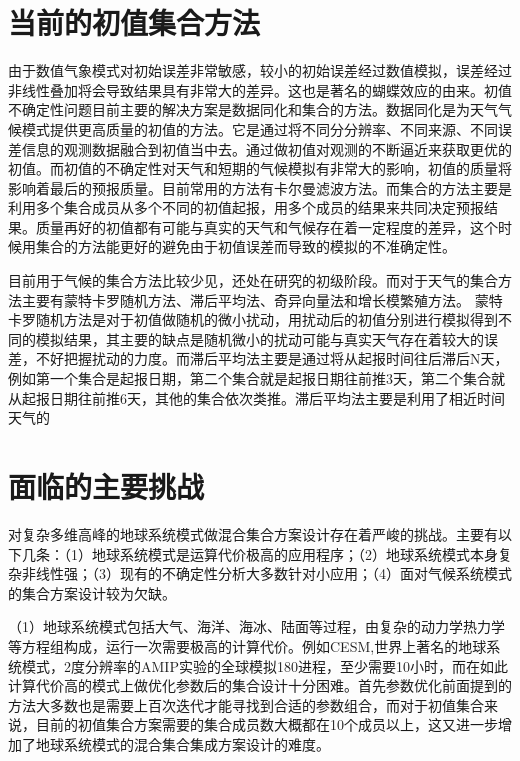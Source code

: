 \section{当前的初值集合方法}
\label{sec:basictable}
由于数值气象模式对初始误差非常敏感，较小的初始误差经过数值模拟，误差经过非线性叠加将会导致结果具有非常大的差异。这也是著名的蝴蝶效应的由来。初值不确定性问题目前主要的解决方案是数据同化和集合的方法。数据同化是为天气气候模式提供更高质量的初值的方法。它是通过将不同分分辨率、不同来源、不同误差信息的观测数据融合到初值当中去。通过做初值对观测的不断逼近来获取更优的初值。而初值的不确定性对天气和短期的气候模拟有非常大的影响，初值的质量将影响着最后的预报质量。目前常用的方法有卡尔曼滤波方法。而集合的方法主要是利用多个集合成员从多个不同的初值起报，用多个成员的结果来共同决定预报结果。质量再好的初值都有可能与真实的天气和气候存在着一定程度的差异，这个时候用集合的方法能更好的避免由于初值误差而导致的模拟的不准确定性。

目前用于气候的集合方法比较少见，还处在研究的初级阶段。而对于天气的集合方法主要有蒙特卡罗随机方法、滞后平均法、奇异向量法和增长模繁殖方法。
蒙特卡罗随机方法是对于初值做随机的微小扰动，用扰动后的初值分别进行模拟得到不同的模拟结果，其主要的缺点是随机微小的扰动可能与真实天气存在着较大的误差，不好把握扰动的力度。而滞后平均法主要是通过将从起报时间往后滞后N天，例如第一个集合是起报日期，第二个集合就是起报日期往前推3天，第二个集合就从起报日期往前推6天，其他的集合依次类推。滞后平均法主要是利用了相近时间天气的

\section{面临的主要挑战}
\label{sec:theorem}
对复杂多维高峰的地球系统模式做混合集合方案设计存在着严峻的挑战。主要有以下几条：（1）地球系统模式是运算代价极高的应用程序；（2）地球系统模式本身复杂非线性强；（3）现有的不确定性分析大多数针对小应用；（4）面对气候系统模式的集合方案设计较为欠缺。

（1）地球系统模式包括大气、海洋、海冰、陆面等过程，由复杂的动力学热力学等方程组构成，运行一次需要极高的计算代价。例如CESM,世界上著名的地球系统模式，2度分辨率的AMIP实验的全球模拟180进程，至少需要10小时，而在如此计算代价高的模式上做优化参数后的集合设计十分困难。首先参数优化前面提到的方法大多数也是需要上百次迭代才能寻找到合适的参数组合，而对于初值集合来说，目前的初值集合方案需要的集合成员数大概都在10个成员以上，这又进一步增加了地球系统模式的混合集合集成方案设计的难度。


